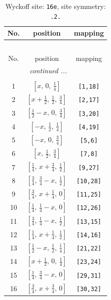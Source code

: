 \documentclass[fleqn,8pt]{jsarticle}
\begin{document}
\renewcommand{\arraystretch}{1.2}
\begin{longtable}{ccc}
\caption{Wyckoff site: {\tt 16e}, site symmetry: {\tt .2.}}
 \\
 \hline \hline
No. & position & mapping \\ \hline \endfirsthead

\multicolumn{2}{l}{\tablename\ \thetable{}} \\
 \hline \hline
No. & position & mapping \\ \hline \endhead

 \hline \hline
\multicolumn{2}{r}{\footnotesize\it continued ...} \\ \endfoot

 \hline \hline
\multicolumn{2}{r}{} \\ \endlastfoot

1 & $\left[ x,\, 0,\, \frac{1}{4} \right]$ & {\tt [1,18]} \\ \hline
2 & $\left[ x + \frac{1}{2},\, \frac{1}{2},\, \frac{3}{4} \right]$ & {\tt [2,17]} \\ \hline
3 & $\left[ \frac{1}{2} - x,\, 0,\, \frac{3}{4} \right]$ & {\tt [3,20]} \\ \hline
4 & $\left[ - x,\, \frac{1}{2},\, \frac{1}{4} \right]$ & {\tt [4,19]} \\ \hline
5 & $\left[ - x,\, 0,\, \frac{3}{4} \right]$ & {\tt [5,6]} \\ \hline
6 & $\left[ x,\, \frac{1}{2},\, \frac{3}{4} \right]$ & {\tt [7,8]} \\ \hline
7 & $\left[ \frac{1}{4},\, x + \frac{3}{4},\, \frac{1}{2} \right]$ & {\tt [9,27]} \\ \hline
8 & $\left[ \frac{3}{4},\, \frac{3}{4} - x,\, \frac{1}{2} \right]$ & {\tt [10,28]} \\ \hline
9 & $\left[ \frac{3}{4},\, x + \frac{1}{4},\, 0 \right]$ & {\tt [11,25]} \\ \hline
10 & $\left[ \frac{1}{4},\, \frac{1}{4} - x,\, 0 \right]$ & {\tt [12,26]} \\ \hline
11 & $\left[ \frac{3}{4},\, \frac{1}{4} - x,\, \frac{1}{2} \right]$ & {\tt [13,15]} \\ \hline
12 & $\left[ \frac{1}{4},\, x + \frac{1}{4},\, \frac{1}{2} \right]$ & {\tt [14,16]} \\ \hline
13 & $\left[ \frac{1}{2} - x,\, \frac{1}{2},\, \frac{1}{4} \right]$ & {\tt [21,22]} \\ \hline
14 & $\left[ x + \frac{1}{2},\, 0,\, \frac{1}{4} \right]$ & {\tt [23,24]} \\ \hline
15 & $\left[ \frac{1}{4},\, \frac{3}{4} - x,\, 0 \right]$ & {\tt [29,31]} \\ \hline
16 & $\left[ \frac{3}{4},\, x + \frac{3}{4},\, 0 \right]$ & {\tt [30,32]} \\
\end{longtable}
\end{document}
